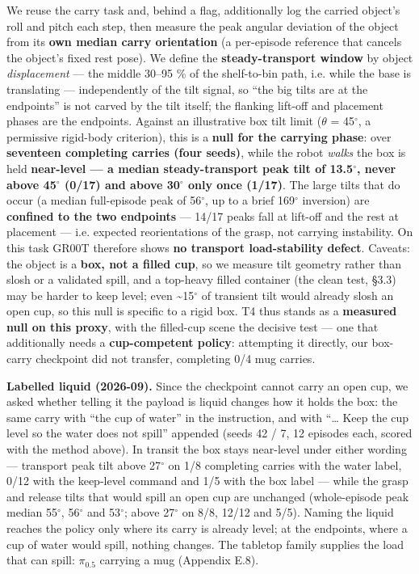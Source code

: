 \documentclass{article}
\begin{document}
We reuse the carry task and, behind a flag, additionally log the carried object's roll and pitch each step, then measure the peak angular deviation of the object from its \textbf{own median carry orientation} (a per-episode reference that cancels the object's fixed rest pose). We define the \textbf{steady-transport window} by object \emph{displacement} --- the middle 30--95 \% of the shelf-to-bin path, i.e. while the base is translating --- independently of the tilt signal, so ``the big tilts are at the endpoints'' is not carved by the tilt itself; the flanking lift-off and placement phases are the endpoints. Against an illustrative box tilt limit ($\theta$ = 45$^{\circ}$, a permissive rigid-body criterion), this is a \textbf{null for the carrying phase}: over \textbf{seventeen completing carries (four seeds)}, while the robot \emph{walks} the box is held \textbf{near-level --- a median steady-transport peak tilt of 13.5$^{\circ}$, never above 45$^{\circ}$ (0/17) and above 30$^{\circ}$ only once (1/17)}. The large tilts that do occur (a median full-episode peak of 56$^{\circ}$, up to a brief 169$^{\circ}$ inversion) are \textbf{confined to the two endpoints} --- 14/17 peaks fall at lift-off and the rest at placement --- i.e. expected reorientations of the grasp, not carrying instability. On this task GR00T therefore shows \textbf{no transport load-stability defect}. Caveats: the object is a \textbf{box, not a filled cup}, so we measure tilt geometry rather than slosh or a validated spill, and a top-heavy filled container (the clean test, \S3.3) may be harder to keep level; even \textasciitilde{}15$^{\circ}$ of transient tilt would already slosh an open cup, so this null is specific to a rigid box. T4 thus stands as a \textbf{measured null on this proxy}, with the filled-cup scene the decisive test --- one that additionally needs a \textbf{cup-competent policy}: attempting it directly, our box-carry checkpoint did not transfer, completing 0/4 mug carries.

\textbf{Labelled liquid (2026-09).} Since the checkpoint cannot carry an open cup, we asked whether telling it the payload is liquid changes how it holds the box: the same carry with ``the cup of water'' in the instruction, and with ``\ldots{} Keep the cup level so the water does not spill'' appended (seeds 42 / 7, 12 episodes each, scored with the method above). In transit the box stays near-level under either wording --- transport peak tilt above 27$^{\circ}$ on 1/8 completing carries with the water label, 0/12 with the keep-level command and 1/5 with the box label --- while the grasp and release tilts that would spill an open cup are unchanged (whole-episode peak median 55$^{\circ}$, 56$^{\circ}$ and 53$^{\circ}$; above 27$^{\circ}$ on 8/8, 12/12 and 5/5). Naming the liquid reaches the policy only where its carry is already level; at the endpoints, where a cup of water would spill, nothing changes. The tabletop family supplies the load that can spill: $\pi_{0.5}$ carrying a mug (Appendix E.8).
\end{document}

